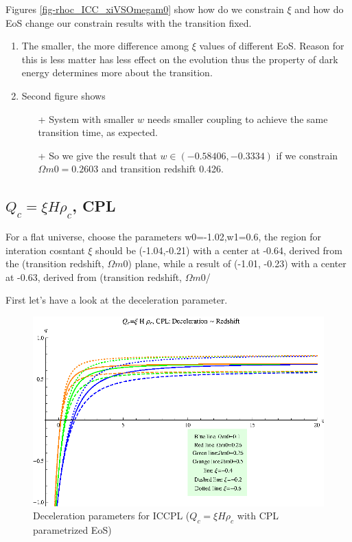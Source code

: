 \documentclass[12pt,a4paper]{article}
\begin{document}
Figures \ref{fig-rhoc_ICC_xiVSOmegam0} show how do we constrain $\xi$ and how do EoS change our constrain results with the transition fixed.
\begin{enumerate}
\item
The smaller, the more difference among $\xi$ values of different EoS. Reason for this is less matter has less effect on the evolution thus the property of dark energy determines more about the transition.
\item
Second figure shows
\begin{enumerate}
\item [+]
System with smaller $w$ needs smaller coupling to achieve the same transition time, as expected.
\item[+]
So we give the result that $w \in (-0.58406, -0.3334)$ if we constrain $\Omega m0 = 0.2603$ and transition redshift 0.426.
\end{enumerate}
\end{enumerate}

\subsection{$Q_c=\xi H\rho_c$, CPL}


For a flat universe, choose the parameters {w0=-1.02,w1=0.6}, the region for interation cosntant $\xi$ should be  (-1.04,-0.21) with a center at -0.64, derived from the (transition redshift, $\Omega m0$) plane, while a result of (-1.01, -0.23) with a center at -0.63, derived from (transition redshift, $\Omega m0$/%


First let's have a look at the deceleration parameter.

\begin{figure}[htpb]
\centering
\includegraphics[width=500pt]{rhoc_ICCPL_DecPara.eps}
\caption{Deceleration parameters for ICCPL ($Q_c=\xi H \rho_c$ with CPL parametrized EoS)}\label{fig-rhoc_ICCPL_DecPara}
\end{figure}
\end{document}
